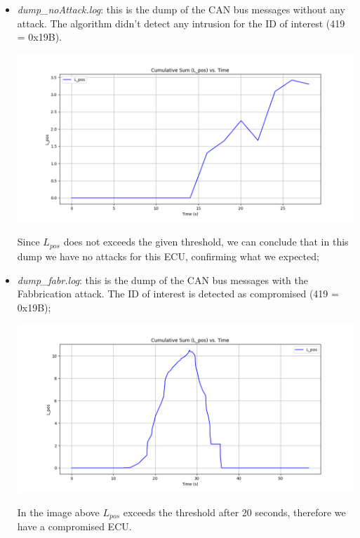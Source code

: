 \documentclass[12pt]{article}
\begin{document}
\begin{itemize}
    \item \textit{dump\_noAttack.log}: this is the dump of the CAN bus messages without any attack. The algorithm 
    didn't detect any intrusion for the ID of interest (419 = 0x19B).
    \begin{center}
        \vspace{-1cm}
        \hspace*{-2cm}
        \includegraphics[scale=0.5]{img/LposNoAttack.png}
    \end{center}
    Since $L_{pos}$ does not exceeds the given threshold, 
    we can conclude that in this dump we have no attacks for this ECU, confirming what we expected;
    \item \textit{dump\_fabr.log}: this is the dump of the CAN bus messages with the Fabbrication attack. The ID 
    of interest is detected as compromised (419 = 0x19B);
    \begin{center}
        \vspace{-1cm}
        \hspace*{-2cm}
        \includegraphics[scale=0.5]{img/LposFabr.png}
    \end{center}
    In the image above $L_{pos}$ exceeds the threshold after 20 seconds, therefore we have a compromised ECU. 

\end{itemize}
\end{document}
